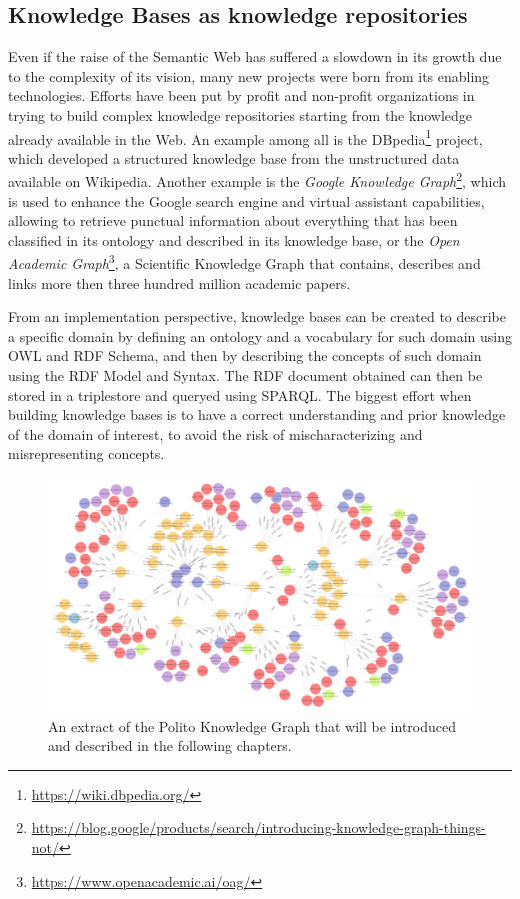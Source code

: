 \documentclass[%
    corpo=13.5pt,
    twoside,
    oldstyle,
    tipotesi=magistrale,
    greek,
    evenboxes
]{toptesi}
\begin{document}
\subsection{Knowledge Bases as knowledge repositories}

Even if the raise of the Semantic Web has suffered a slowdown in its growth
due to the complexity of its vision, many new projects were born from its
enabling technologies. Efforts have been put by profit and
non-profit organizations in trying to build complex knowledge repositories
starting from the knowledge already available in the Web. An example among all
is the DBpedia\footnote{\url{https://wiki.dbpedia.org/}} project, which
developed a structured knowledge base from the unstructured data available on
Wikipedia.
Another example is the
\emph{Google Knowledge Graph}\footnote{\url{https://blog.google/products/search/introducing-knowledge-graph-things-not/}},
which is used to enhance the Google search engine and virtual assistant
capabilities, allowing to retrieve punctual information about everything that
has been classified in its ontology and described in its knowledge base, or
the \emph{Open Academic Graph}\footnote{\url{https://www.openacademic.ai/oag/}},
a Scientific Knowledge Graph that contains, describes and links more then
three hundred million academic papers.

From an implementation perspective, knowledge bases can be created to
describe a specific domain by defining an ontology and a vocabulary for
such domain using OWL and RDF Schema, and then by describing the concepts
of such domain using the RDF Model and Syntax. The RDF document obtained
can then be stored in a triplestore and queryed using SPARQL. The biggest effort
when building knowledge bases is to have a correct understanding and prior
knowledge of the domain of interest, to avoid the risk of mischaracterizing
and misrepresenting concepts.

\begin{figure}[h]
    \centering
    \includegraphics[scale=0.4]{img/geranium-knowledge-base-example.png}
    \caption{An extract of the Polito Knowledge Graph that will be introduced and
    described in the following chapters.}
    \label{fig:geranium-knowledge-base-example}
\end{figure}
\end{document}
